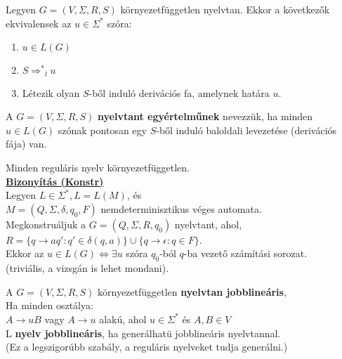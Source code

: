 \begin{frame}
\begin{tcolorbox}[title={Tétel: Ekvivalens állítások derivációs fákra}]
Legyen $G = (V, {\Sigma}, R, S)$ környezetfüggetlen nyelvtan. Ekkor a következők ekvivalensek az $u \in {\Sigma}^*$ szóra:\\
\begin{enumerate}
\item $u \in L(G)$
\item $S {{\Rightarrow}^*}_l u$
\item Létezik olyan $S$-ből induló derivációs fa, amelynek határa $u$.
\end{enumerate}
\end{tcolorbox}

\end{frame}

\begin{frame}
\begin{tcolorbox}[title={Egyértelmű nyelvtan}]
A $G = (V, {\Sigma}, R, S)$ \textbf{nyelvtant egyértelműnek} nevezzük, ha minden $u \in L(G)$ szónak pontosan egy $S$-ből induló baloldali levezetése (derivációs fája) van.
\end{tcolorbox}
\end{frame}

\begin{frame}
\begin{tcolorbox}[title={Tétel: Reguláris nyelv környezetfüggetlen}]
Minden reguláris nyelv környezetfüggetlen.\\
\tcblower
\msmallskip
\underline{\textbf{Bizonyítás (Konstr)}}\\
\mmedskip
Legyen $L \in {\Sigma}^*, L = L(M)$, és\\
$M = (Q, {\Sigma}, {\delta}, q_0, F)$ nemdeterminisztikus véges automata.\\
\mbigskip
Megkonstruáljuk a $G = (Q, {\Sigma}, R, q_0)$ nyelvtant, ahol,\\
$R = \{q \rightarrow aq' : q' \in {\delta}(q, a)\} \cup \{q \rightarrow \epsilon : q \in F \}$.\\
Ekkor az $u \in  L(G) \iff \exists u$ szóra $q_0$-ból $q$-ba vezető számítási sorozat.\\
(triviális, a vizsgán is lehet mondani).
\end{tcolorbox}

\end{frame}

\begin{frame}
\begin{tcolorbox}[title={Jobblineáris nyelvtan, nyelv}]
A $G = (V, {\Sigma}, R, S)$ környezetfüggetlen \textbf{nyelvtan jobblineáris},\\
Ha minden osztálya:\\
\mmedskip
$A \rightarrow uB$ vagy $A \rightarrow u$ alakú, ahol $u \in {\Sigma}^*$ és $A, B \in V$\\
\mbigskip
L \textbf{nyelv jobblineáris}, ha generálhatü jobblineáris nyelvtannal.\\
\msmallskip
(Ez a legszigorúbb szabály, a reguláris nyelveket tudja generálni.)
\end{tcolorbox}
\end{frame}

